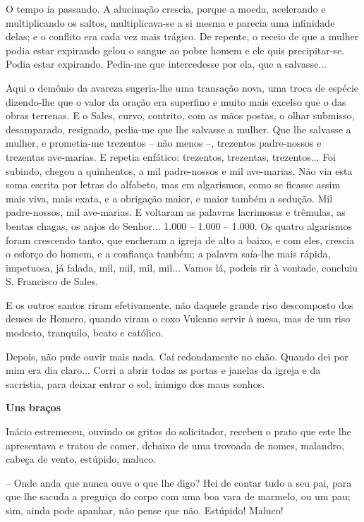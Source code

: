 O tempo ia passando. A alucinação crescia, porque a moeda, acelerando e
multiplicando os saltos, multiplicava-se a si mesma e parecia uma
infinidade delas; e o conflito era cada vez mais trágico. De repente, o
receio de que a mulher podia estar expirando gelou o sangue ao pobre
homem e ele quis precipitar-se. Podia estar expirando. Pedia-me que
intercedesse por ela, que a salvasse...

Aqui o demônio da avareza sugeria-lhe uma transação nova, uma troca de
espécie dizendo-lhe que o valor da oração era superfino e muito mais
excelso que o das obras terrenas. E o Sales, curvo, contrito, com as
mãos postas, o olhar submisso, desamparado, resignado, pedia-me que lhe
salvasse a mulher. Que lhe salvasse a mulher, e prometia-me trezentos --
não menos --, trezentos padre-nossos e trezentas ave-marias. E repetia
enfático: trezentos, trezentas, trezentos... Foi subindo, chegou a
quinhentos, a mil padre-nossos e mil ave-marias. Não via esta soma
escrita por letras do alfabeto, mas em algarismos, como se ficasse assim
mais viva, mais exata, e a obrigação maior, e maior também a sedução.
Mil padre-nossos, mil ave-marias. E voltaram as palavras lacrimosas e
trêmulas, as bentas chagas, os anjos do Senhor... 1.000 -- 1.000 --
1.000. Os quatro algarismos foram crescendo tanto, que encheram a igreja
de alto a baixo, e com eles, crescia o esforço do homem, e a confiança
também; a palavra saía-lhe mais rápida, impetuosa, já falada, mil, mil,
mil, mil... Vamos lá, podeis rir à vontade, concluiu S. Francisco de
Sales.

E os outros santos riram efetivamente, não daquele grande riso
descomposto dos deuses de Homero, quando viram o coxo Vulcano servir à
mesa, mas de um riso modesto, tranquilo, beato e católico.

Depois, não pude ouvir mais nada. Caí redondamente no chão. Quando dei
por mim era dia claro... Corri a abrir todas as portas e janelas da
igreja e da sacristia, para deixar entrar o sol, inimigo dos maus
sonhos.

\textbf{Uns braços}

Inácio estremeceu, ouvindo os gritos do solicitador, recebeu o prato que
este lhe apresentava e tratou de comer, debaixo de uma trovoada de
nomes, malandro, cabeça de vento, estúpido, maluco.

-- Onde anda que nunca ouve o que lhe digo? Hei de contar tudo a seu
pai, para que lhe sacuda a preguiça do corpo com uma boa vara de
marmelo, ou um pau; sim, ainda pode apanhar, não pense que não.
Estúpido! Maluco!

